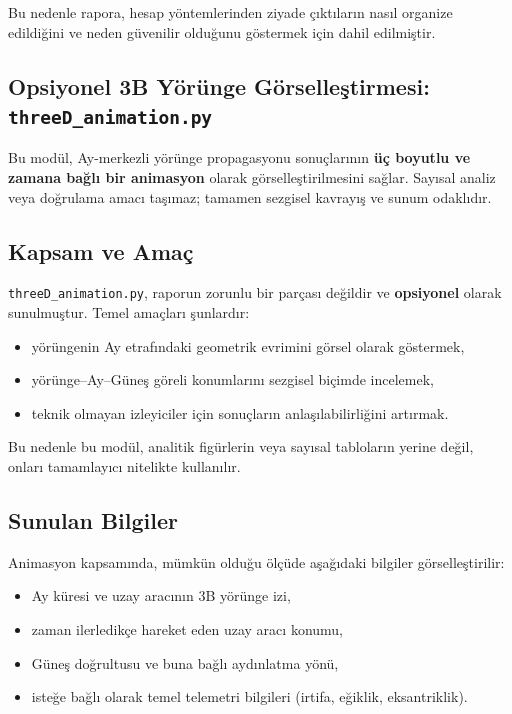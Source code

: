 Bu nedenle rapora, hesap yöntemlerinden ziyade çıktıların nasıl organize edildiğini ve neden güvenilir olduğunu göstermek için dahil edilmiştir.


\subsection{Opsiyonel 3B Yörünge Görselleştirmesi: \texttt{threeD\_animation.py}}
\label{subsec:threeD_animation}

Bu modül, Ay-merkezli yörünge propagasyonu sonuçlarının
\textbf{üç boyutlu ve zamana bağlı bir animasyon} olarak
görselleştirilmesini sağlar. Sayısal analiz veya doğrulama amacı taşımaz; tamamen sezgisel kavrayış ve sunum odaklıdır.

\subsection*{Kapsam ve Amaç}
\texttt{threeD\_animation.py}, raporun zorunlu bir parçası değildir ve
\textbf{opsiyonel} olarak sunulmuştur.
Temel amaçları şunlardır:
\begin{itemize}
  \item yörüngenin Ay etrafındaki geometrik evrimini görsel olarak göstermek,
  \item yörünge–Ay–Güneş göreli konumlarını sezgisel biçimde incelemek,
  \item teknik olmayan izleyiciler için sonuçların anlaşılabilirliğini artırmak.
\end{itemize}

Bu nedenle bu modül,
analitik figürlerin veya sayısal tabloların yerine değil,
onları tamamlayıcı nitelikte kullanılır.

\subsection*{Sunulan Bilgiler}
Animasyon kapsamında, mümkün olduğu ölçüde aşağıdaki bilgiler görselleştirilir:
\begin{itemize}
  \item Ay küresi ve uzay aracının 3B yörünge izi,
  \item zaman ilerledikçe hareket eden uzay aracı konumu,
  \item Güneş doğrultusu ve buna bağlı aydınlatma yönü,
  \item isteğe bağlı olarak temel telemetri bilgileri
        (irtifa, eğiklik, eksantriklik).
\end{itemize}

